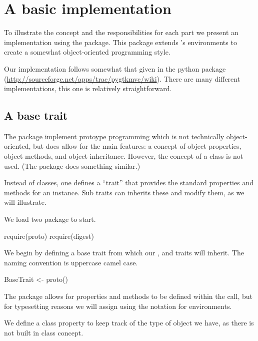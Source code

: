 \documentclass{memoir}
\begin{document}
\section{A basic implementation}
\label{sec:basic-implementation}
To illustrate the concept and the responsibilities for each part we
present an implementation using the  package. This package
extends \R's environments to create a somewhat object-oriented
programming style. 

Our implementation follows somewhat that given in the 
python package
(\url{http://sourceforge.net/apps/trac/pygtkmvc/wiki}). There are many
different implementations, this one is relatively straightforward.


\subsection{A base trait}
\label{sec:base-trait}

The  package implement protoype programming which is not
technically object-oriented, but does allow for the main features:
a concept of object properties, object methods, and object
inheritance. However, the concept of a class is not used. (The
 package does something similar.) 

Instead of classes, one defines a ``trait'' that provides the standard
properties and methods for an instance. Sub traits can inherits these
and modify them, as we will illustrate. 

We load two package to start.
\begin{Schunk}
\begin{Sinput}
 require(proto)
 require(digest)
\end{Sinput}
\end{Schunk}

We begin by defining a base trait from which our ,
 and  traits will inherit. The naming
convention is uppercase camel case.
\begin{Schunk}
\begin{Sinput}
 BaseTrait <- proto()
\end{Sinput}
\end{Schunk}
The  package allows for properties and methods to be
defined within the  call, but for typesetting reasons we
will assign using the \code{\$} notation for environments. 

We define a class property to keep track of the type of 
object we have, as there is not built in class concept.
\begin{Schunk}
\end{Schunk}
\end{document}
